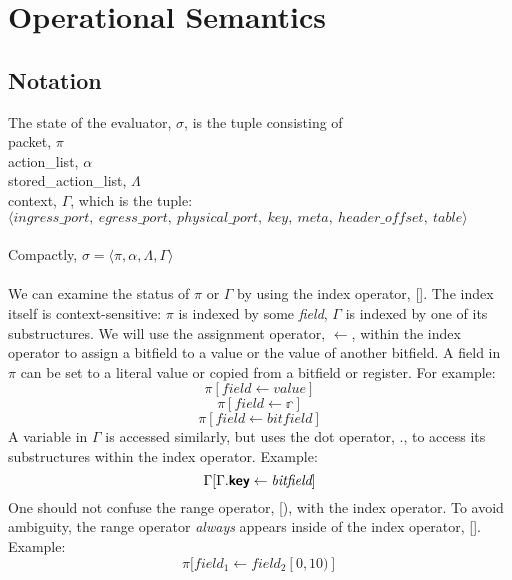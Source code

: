 
\section{Operational Semantics}

\subsection{Notation}

The state of the evaluator, $\sigma$, is the tuple consisting of \\
packet, $\pi$\\
action\_list, $\alpha$ \\
stored\_action\_list, $\Lambda$ \\
context, $\Gamma$, which is the tuple: \\
$\langle ingress\_port, \ egress\_port, \ physical\_port, \ key, \ meta, \ header\_offset, \ table \rangle$ \\ \\
Compactly, $\sigma = \langle \pi, \alpha, \Lambda, \Gamma \rangle$
\\ \\
We can examine the status of $\pi$ or $\Gamma$ by using the index operator, []. The index itself is context-sensitive: $\pi$ is indexed by some \textit{field}, $\Gamma$ is indexed by one of its substructures. We will use the assignment operator, $\leftarrow$, within the index operator to assign a bitfield to a value or the value of another bitfield.
A field in $\pi$ can be set to a literal value or copied from a bitfield or register. For example:
\begin{equation}
  \pi[\textit{field} \leftarrow \textit{value}]
\end{equation}
\begin{equation}
  \pi[\textit{field} \leftarrow \mathbb{r}]
\end{equation}
\begin{equation}
  \pi[\textit{field} \leftarrow \textit{bitfield}]
\end{equation}
A variable in $\Gamma$ is accessed similarly, but uses the dot operator, ., to access its substructures within the index operator. Example:
\begin{equation}
  \Gamma[\Gamma.\bm{\mathsf{{key}}} \leftarrow \textit{bitfield}]
\end{equation}
One should not confuse the range operator, [), with the index operator. To avoid ambiguity, the range operator \textit{always} appears inside
of the index operator, []. Example:
\begin{equation}
  \pi[field_1 \leftarrow field_2[0, 10)]
\end{equation}

